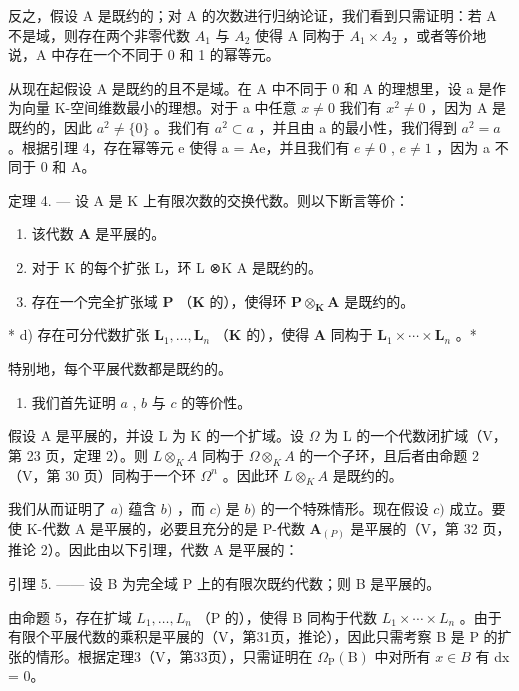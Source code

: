 反之，假设 A 是既约的；对 A 的次数进行归纳论证，我们看到只需证明：若 A 不是域，则存在两个非零代数 \(A_{1}\) 与 \(A_{2}\) 使得 A 同构于 \(A_{1} \times A_{2}\) ，或者等价地说，A 中存在一个不同于 0 和 1 的幂等元。

从现在起假设 A 是既约的且不是域。在 A 中不同于 0 和 A 的理想里，设 a 是作为向量 K-空间维数最小的理想。对于 a 中任意 \(x \neq 0\) 我们有 \(x^{2} \neq 0\) ，因为 A 是既约的，因此 \(a^{2} \neq \{0\}\) 。我们有 \(a^{2} \subset a\) ，并且由 a 的最小性，我们得到 \(a^{2} = a\) 。根据引理 4，存在幂等元 e 使得 a = Ae，并且我们有 \(e \neq 0\) , \(e \neq 1\) ，因为 a 不同于 0 和 A。

定理 4. --- 设 A 是 K 上有限次数的交换代数。则以下断言等价：

\begin{enumerate}
\def\labelenumi{\alph{enumi})}
\item
  该代数 \(\mathbf{A}\) 是平展的。
\item
  对于 K 的每个扩张 L，环 L ⊗K A 是既约的。
\item
  存在一个完全扩张域 \(\mathbf{P}\) （\(\mathbf{K}\) 的），使得环 \(\mathbf{P} \otimes_{\mathbf{K}} \mathbf{A}\) 是既约的。
\end{enumerate}

* d) 存在可分代数扩张 \(\mathbf{L}_1, \ldots, \mathbf{L}_n\) （\(\mathbf{K}\) 的），使得 \(\mathbf{A}\) 同构于 \(\mathbf{L}_1 \times \cdots \times \mathbf{L}_n\) 。*

特别地，每个平展代数都是既约的。

\begin{enumerate}
\def\labelenumi{\Alph{enumi})}
\tightlist
\item
  我们首先证明 \(a\) , \(b\) 与 \(c\) 的等价性。
\end{enumerate}

假设 A 是平展的，并设 L 为 K 的一个扩域。设 \(\Omega\) 为 L 的一个代数闭扩域（V，第 23 页，定理 2）。则 \(L \otimes_{K} A\) 同构于 \(\Omega \otimes_{K} A\) 的一个子环，且后者由命题 2（V，第 30 页）同构于一个环 \(\Omega^{n}\) 。因此环 \(L \otimes_{K} A\) 是既约的。

我们从而证明了 \(a)\) 蕴含 \(b)\) ，而 \(c)\) 是 \(b)\) 的一个特殊情形。现在假设 \(c)\) 成立。要使 K-代数 A 是平展的，必要且充分的是 P-代数 \(\mathbf{A}_{(P)}\) 是平展的（V，第 32 页，推论 2）。因此由以下引理，代数 A 是平展的：

引理 5. —— 设 B 为完全域 P 上的有限次既约代数；则 B 是平展的。

由命题 5，存在扩域 \(L_{1}, \ldots, L_{n}\) （P 的），使得 B 同构于代数 \(L_{1} \times \cdots \times L_{n}\) 。由于有限个平展代数的乘积是平展的（V，第31页，推论），因此只需考察 B 是 P 的扩张的情形。根据定理3（V，第33页），只需证明在 \(\Omega_{\mathrm{P}}(\mathrm{B})\) 中对所有 \(x \in B\) 有 dx = 0。

